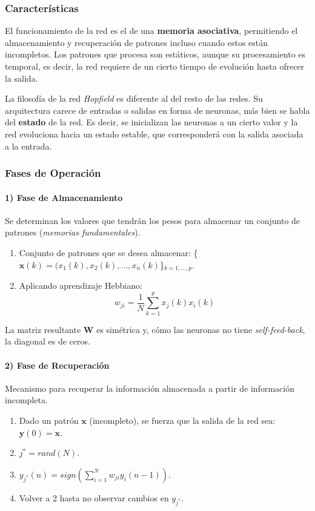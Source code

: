 \documentclass[10pt,a4paper]{article}
\begin{document}
\subsubsection{Características}

El funcionamiento de la red es el de una \textbf{memoria asociativa}, permitiendo el almacenamiento y recuperación de patrones incluso cuando estos están incompletos. Los patrones que procesa son estáticos, aunque su procesamiento es temporal, es decir, la red requiere de un cierto tiempo de evolución hasta ofrecer la salida.

La filosofía de la red \textit{Hopfield} es diferente al del resto de las redes. Su arquitectura carece de entradas o salidas en forma de neuronas, más bien se habla del \textbf{estado} de la red. Es decir, se inicializan las neuronas a un cierto valor y la red evoluciona hacia un estado estable, que corresponderá con la salida asociada a la entrada.

\subsubsection{Fases de Operación}

\begin{multicols}{2}

\paragraph{1) Fase de Almacenamiento}
Se determinan los valores que tendrán los pesos para almacenar un conjunto de patrones (\textit{memorias fundamentales}).
\begin{enumerate}
\item Conjunto de patrones que se desea almacenar: \{$\mathbf{x}(k)=(x_1(k), x_2(k), ..., x_n(k)$\}$_{k=1,...,p}$.
\item Aplicando aprendizaje Hebbiano:
\[w_{ji}=\frac{1}{N}\sum_{k=1}^p x_{j}(k) x_{i}(k)\]
\end{enumerate}
La matriz resultante $\mathbf{W}$ es simétrica y, cómo las neuronas no tiene \textit{self-feed-back}, la diagonal es de ceros.

\columnbreak
\paragraph{2) Fase de Recuperación}
Mecanismo para recuperar la información almacenada a partir de
información incompleta.
\begin{enumerate}
\item Dado un patrón $\mathbf{x}$ (incompleto), se fuerza que la salida de la red sea: $\mathbf{y}(0)=\mathbf{x}$.
\item $j^* = rand(N)$.
\item $y_{j^*}(n) = sign\left(\sum_{i=1}^N w_{ji} y_i (n-1)\right)$.
\item Volver a 2 hasta no observar cambios en $y_{j^*}$.
\end{enumerate}

\end{multicols}
\end{document}

